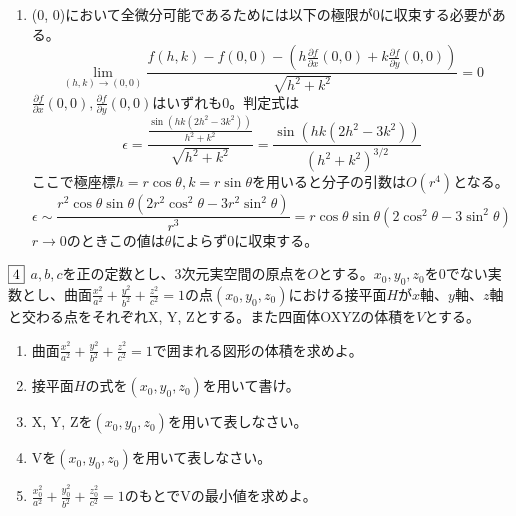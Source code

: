 \documentclass[dvipdfmx]{jsreport}
\begin{document}
\begin{souanswer}
\begin{enumerate}
	\item (0, 0)において全微分可能であるためには以下の極限が0に収束する必要がある。
\begin{equation*}
	\lim_{(h, k)\to (0, 0)} \frac{f(h, k)- f(0, 0)- \left(h\frac{\partial f}{\partial x}(0, 0)+ k\frac{\partial f}{\partial y}(0, 0)\right)}{\sqrt{h^2+ k^2}}= 0
\end{equation*}
	$\frac{\partial f}{\partial x}(0, 0), \frac{\partial f}{\partial y}(0, 0)$はいずれも0。判定式は
\begin{equation*}
	\epsilon= \frac{\frac{\sin(hk(2h^2- 3k^2))}{h^2+ k^2}}{\sqrt{h^2+ k^2}}= \frac{\sin{(hk(2h^2- 3k^2))}}{(h^2+ k^2)^{3/2}}
\end{equation*}
	ここで極座標$h= r\cos{\theta}, k= r\sin{\theta}$を用いると分子の引数は$O(r^4)$となる。
\begin{equation*}
	\epsilon\sim \frac{r^2\cos{\theta}\sin{\theta}(2r^2\cos^2{\theta}- 3r^2\sin^2{\theta})}{r^3}= r\cos{\theta}\sin{\theta}(2\cos^2{\theta}- 3\sin^2{\theta})
\end{equation*}
	$r\to 0$のときこの値は$\theta$によらず0に収束する。
\end{enumerate}
\end{souanswer}


\begin{tcolorbox} %
	$\fbox{4}$ $a, b, c$を正の定数とし、3次元実空間の原点を$O$とする。$x_0, y_0, z_0$を0でない実数とし、曲面$\frac{x^2}{a^2}+ \frac{y^2}{b^2}+ \frac{z^2}{c^2}= 1$の点$(x_0, y_0, z_0)$における接平面$H$が$x$軸、$y$軸、$z$軸と交わる点をそれぞれX, Y, Zとする。また四面体OXYZの体積を$V$とする。
\begin{enumerate}
	\item 曲面$\frac{x^2}{a^2}+ \frac{y^2}{b^2}+ \frac{z^2}{c^2}= 1$で囲まれる図形の体積を求めよ。
	\item 接平面$H$の式を$(x_0, y_0, z_0)$を用いて書け。
	\item X, Y, Zを$(x_0, y_0, z_0)$を用いて表しなさい。
	\item Vを$(x_0, y_0, z_0)$を用いて表しなさい。
	\item $\frac{x_0^2}{a^2}+ \frac{y_0^2}{b^2}+ \frac{z_0^2}{c^2}= 1$のもとでVの最小値を求めよ。
\end{enumerate}
\end{tcolorbox}
\end{document}

